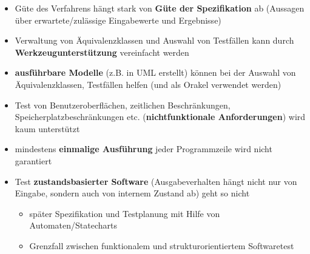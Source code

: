 \begin{itemize}
	\item Güte des Verfahrens hängt stark von \textbf{Güte der Spezifikation} ab (Aussagen über erwartete/zulässige Eingabewerte und Ergebnisse)
	\item Verwaltung von Äquivalenzklassen und Auswahl von Testfällen kann durch \textbf{Werkzeugunterstützung} vereinfacht werden
	\item \textbf{ausführbare Modelle} (z.B. in UML erstellt) können bei der Auswahl von Äquivalenzklassen, Testfällen helfen (und als Orakel verwendet werden)
	\item Test von Benutzeroberflächen, zeitlichen Beschränkungen, Speicherplatzbeschränkungen etc. (\textbf{nichtfunktionale Anforderungen}) wird kaum unterstützt
	\item mindestens \textbf{einmalige Ausführung} jeder Programmzeile wird nicht garantiert
	\item Test \textbf{zustandsbasierter Software} (Ausgabeverhalten hängt nicht nur von Eingabe, sondern auch von internem Zustand ab) geht so nicht
	\begin{itemize}
		\item später Spezifikation und Testplanung mit Hilfe von Automaten/Statecharts
		\item Grenzfall zwischen funktionalem und strukturorientiertem Softwaretest
	\end{itemize}
\end{itemize}

